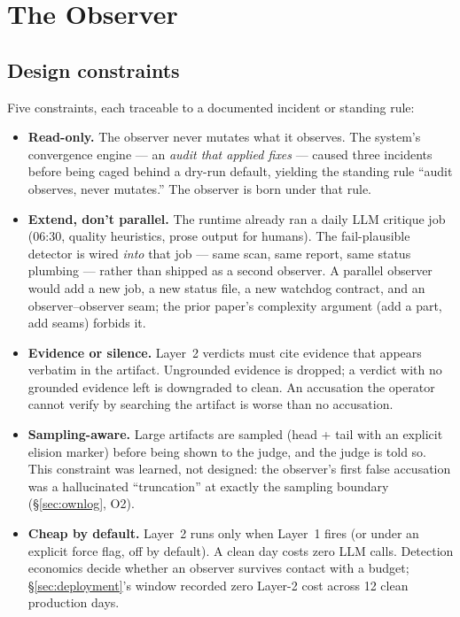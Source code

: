 \documentclass[11pt]{article}
\begin{document}
\section{The Observer}
\label{sec:observer}

\subsection{Design constraints}
\label{sec:constraints}

Five constraints, each traceable to a documented incident or standing
rule:

\begin{itemize}
\item \textbf{Read-only.} The observer never mutates what it observes.
  The system's convergence engine --- an \emph{audit that applied
  fixes} --- caused three incidents before being caged behind a dry-run
  default, yielding the standing rule ``audit observes, never
  mutates.'' The observer is born under that rule.
\item \textbf{Extend, don't parallel.} The runtime already ran a daily
  LLM critique job (06:30, quality heuristics, prose output for
  humans). The fail-plausible detector is wired \emph{into} that
  job --- same scan, same report, same status plumbing --- rather than
  shipped as a second observer. A parallel observer would add a new
  job, a new status file, a new watchdog contract, and an
  observer--observer seam; the prior paper's complexity argument (add a
  part, add seams) forbids it.
\item \textbf{Evidence or silence.} Layer~2 verdicts must cite evidence
  that appears verbatim in the artifact. Ungrounded evidence is
  dropped; a verdict with no grounded evidence left is downgraded to
  clean. An accusation the operator cannot verify by searching the
  artifact is worse than no accusation.
\item \textbf{Sampling-aware.} Large artifacts are sampled (head +
  tail with an explicit elision marker) before being shown to the
  judge, and the judge is told so. This constraint was learned, not
  designed: the observer's first false accusation was a hallucinated
  ``truncation'' at exactly the sampling boundary (\S\ref{sec:ownlog},
  O2).
\item \textbf{Cheap by default.} Layer~2 runs only when Layer~1 fires
  (or under an explicit force flag, off by default). A clean day costs
  zero LLM calls. Detection economics decide whether an observer
  survives contact with a budget; \S\ref{sec:deployment}'s window
  recorded zero Layer-2 cost across 12 clean production days.
\end{itemize}
\end{document}
